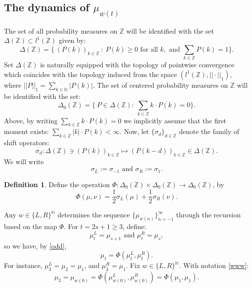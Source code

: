 \documentclass[10pt]{amsart}
\theoremstyle{definition}
\newtheorem{definition}[theorem]{Definition}
\numberwithin{equation}{section}
\newcommand{\N}{\mathbb{N}}
\newcommand{\Z}{\mathbb{Z}}
\begin{document}
\subsection{The dynamics of $\mu_{w(t)}$}
The set of all probability measures on $\Z$ will be identified with the set $\Delta(\Z)\subset l^1(\Z)$ given by:
$$\Delta(\Z)=\{\ (P(k))_{k\in\Z}\ \colon\ P(k)\geq 0\mbox{ for all }k, \mbox{ and } \sum\limits_{k\in\Z}P(k)=1\}.$$
Set $\Delta(\Z)$ is naturally equipped with the topology of pointwise convergence which coincides with the topology induced from the space $(l^1(\Z),||\cdot||_1)$, where  $||P||_1=\sum\limits_{k\in\N}|P(k)|$. The set of centered probability measures on $\Z$ will be identified with the set:
$$\Delta_0(\Z)=\{\ P\in \Delta(\Z)\colon\  \sum\limits_{k\in\Z}k\cdot P(k)=0\}.$$
Above, by writing $\sum\limits_{k\in\Z}k\cdot P(k)=0$ we implicitly assume that the first moment exists: $\sum\limits_{k\in\Z}|k|\cdot P(k)<\infty$. Now, let $\{\sigma_d\}_{d\in\Z}$ denote the family of shift operators:
$$\sigma_d\colon \Delta(\Z)\ni (P(k))_{k\in\Z}\longmapsto  (P(k-d))_{k\in\Z}\in \Delta(\Z).$$
 We will write 
\begin{equation}\label{SLR}
\sigma_L:=\sigma_{-1}\mbox{ and }\sigma_R:=\sigma_{1}.
\end{equation}


\begin{definition}\label{Phi}
Define the operation $\Phi \colon \Delta_0(\Z) \times\Delta_0(\Z) \to\Delta_0(\Z)$, by
\[
  \Phi(\mu, \nu) = \frac{1}{2} \sigma_L(\mu) + \frac{1}{2} \sigma_R(\nu).
\]
\end{definition}%
Any $w\in\{L,R\}^\N$  determines the sequence $\{\mu_{w(n)}\}_{n=-1}^{\infty}$ through the recursion based on the map $\Phi$.  For $t=2s+1\geq 3$, define:
\begin{equation}\label{dee}
\mu^L_{t}=\mu_{s+1}\mbox{ and }\mu^R_{t}=\mu_{s},
\end{equation}
so we have,  by \eqref{odd},
 \begin{equation}\label{P}
\mu_t=\Phi(\mu^L_t,\mu^R_t).
\end{equation}
For instance, $\mu^L_3=\mu_2=\mu_1$, and $\mu^R_3=\mu_1$. Fix $w\in\{L,R\}^\N$. With notation \eqref{www}: 
$$\mu_3=\mu_{w(0)}=\Phi(\mu^L_{w(0)},\mu^R_{w(0)})=\Phi(\mu_1,\mu_1).$$
\end{document}
